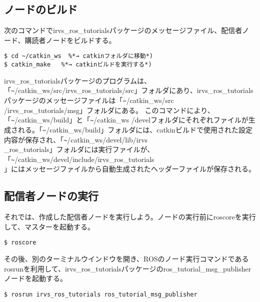 \subsection{ノードのビルド}

次のコマンドでirvs\_ros\_tutorialsパッケージのメッセージファイル、配信者ノード、購読者ノードをビルドする。

\begin{lstlisting}[language=ROS]
$ cd ~/catkin_ws  %*→ catkinフォルダに移動*)
$ catkin_make   %*→ catkinビルドを実行する*)
\end{lstlisting}

irvs\_ros\_tutorialsパッケージのプログラムは、「\verb|~|/catkin\_ws/src/irvs\_ros\_tutorials/src」フォルダにあり、irvs\_ros\_tutorialsパッケージのメッセージファイルは「\verb|~|/catkin\_ws/src\\/irvs\_ros\_tutorials/msg」フォルダにある。
このコマンドにより、「\verb|~|/catkin\_ws/build」と「\verb|~|/catkin\_ws /develフォルダにそれぞれファイルが生成される。「\verb|~|/catkin\_ws/build」フォルダには、catkinビルドで使用された設定内容が保存され、「\verb|~|/catkin\_ws/devel/lib/irvs\\\_ros\_tutorials」フォルダには実行ファイルが、「\verb|~|/catkin\_ws/devel/include/irvs\_ros\_tutorials\\」にはメッセージファイルから自動生成されたヘッダーファイルが保存される。

\subsection{配信者ノードの実行}

それでは、作成した配信者ノードを実行しよう。ノードの実行前にroscoreを実行して、マスターを起動する。

\begin{lstlisting}[language=ROS]
$ roscore
\end{lstlisting}

その後、別のターミナルウインドウを開き、ROSのノード実行コマンドであるrosrunを利用して、irvs\_ros\_tutorialsパッケージのros\_tutorial\_msg\_publisherノードを起動する。

\begin{lstlisting}[language=ROS]
$ rosrun irvs_ros_tutorials ros_tutorial_msg_publisher
\end{lstlisting}

